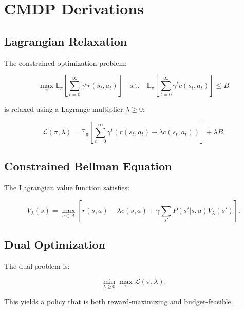 \chapter{CMDP Derivations}

\section{Lagrangian Relaxation}

The constrained optimization problem:


\[
\max_{\pi} \mathbb{E}_{\pi}\left[\sum_{t=0}^{\infty} \gamma^t r(s_t,a_t)\right]
\quad \text{s.t.} \quad
\mathbb{E}_{\pi}\left[\sum_{t=0}^{\infty} \gamma^t c(s_t,a_t)\right] \le B
\]



is relaxed using a Lagrange multiplier $\lambda \ge 0$:


\[
\mathcal{L}(\pi,\lambda) =
\mathbb{E}_{\pi}\left[\sum_{t=0}^{\infty} \gamma^t (r(s_t,a_t) - \lambda c(s_t,a_t))\right]
+ \lambda B.
\]



\section{Constrained Bellman Equation}

The Lagrangian value function satisfies:


\[
V_\lambda(s) =
\max_{a \in A} \left[
r(s,a) - \lambda c(s,a)
+ \gamma \sum_{s'} P(s'|s,a) V_\lambda(s')
\right].
\]



\section{Dual Optimization}

The dual problem is:


\[
\min_{\lambda \ge 0} \max_{\pi} \mathcal{L}(\pi,\lambda).
\]



This yields a policy that is both reward-maximizing and budget-feasible.
